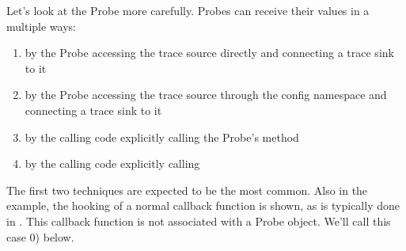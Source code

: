 \documentclass[letterpaper,10pt,english]{sphinxmanual}
\begin{document}
\begin{quote}

\begin{sphinxVerbatim}[commandchars=\\\{\}]
 
   
       
    
    
       
\end{sphinxVerbatim}
\end{quote}

Let’s look at the Probe more carefully.  Probes can receive their values
in a multiple ways:
\begin{enumerate}
%
\item {} 
by the Probe accessing the trace source directly and connecting
a trace sink to it

\item {} 
by the Probe accessing the trace source through the config namespace
and connecting a trace sink to it

\item {} 
by the calling code explicitly calling the Probe’s  method

\item {} 
by the calling code explicitly calling 

\end{enumerate}

The first two techniques are expected to be the most common.  Also in the
example, the hooking of a normal callback function is shown,
as is typically done in .  This callback function is not associated
with a Probe object.  We’ll call this case 0) below.
\end{document}
